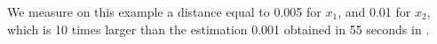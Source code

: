 We measure on this example a distance equal to 0.005 for $x_1$, and 0.01 for $x_2$, which is 10 times larger than the estimation 0.001 obtained 
in 55 seconds in \cite{underapprox16}. 




